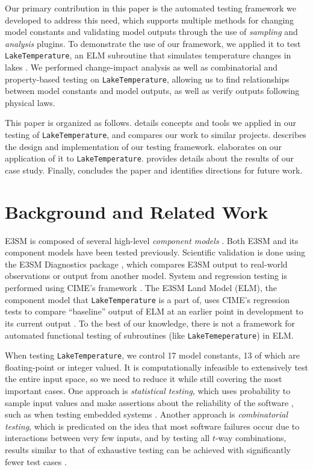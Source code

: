\documentclass[10pt,twocolumn]{article}
\newcommand{\term}[1]{%
    \emph{#1}%
}
\begin{document}
Our primary contribution in this paper is the automated testing framework we
developed to address this need, which supports multiple methods for changing model 
constants and validating model outputs through the use of {\it sampling} and {\it 
analysis} plugins. To demonstrate the use of our framework, we applied it to test
\verb|LakeTemperature|, an ELM subroutine that simulates temperature changes in lakes 
\cite{laketemperature}. We performed change-impact analysis as well as combinatorial and 
property-based testing on \verb|LakeTemperature|, allowing us to find relationships 
between model constants and model outputs, as well as verify outputs following physical laws.

This paper is organized as follows.  details concepts and tools we 
applied in our testing of \verb|LakeTemperature|, and compares our work to similar 
projects.  describes the design and implementation 
of our testing framework.  elaborates on our application of it to 
\verb|LakeTemperature|.  provides details about the results of our case 
study. Finally,  concludes the paper and identifies directions for 
future work.

\section{Background and Related Work}
\label{sec:background}

E3SM is composed of several high-level \term{component models}. Both E3SM and its component
models have been tested previously. Scientific validation is done using the E3SM 
Diagnostics package \cite{e3sm-diag}, which compares E3SM output to real-world 
observations or output from another model. System and regression testing is performed 
using CIME's framework \cite{cime}. The E3SM Land Model (ELM), the component model 
that \verb|LakeTemperature| is a part of, uses CIME's regression tests to compare 
``baseline'' output of ELM at an earlier point in development to its current output
\cite{elm-testing}. To the best of our knowledge, there is not a framework for 
automated functional testing of subroutines (like \verb|LakeTemeperature|) in 
ELM.

When testing \verb|LakeTemperature|, we control 17 model constants, 13 of which are
floating-point or integer valued. It is computationally infeasible to
extensively test the entire input space, so we need to reduce it while still covering the 
most important cases. One approach is {\it statistical testing}, which uses probability to 
sample input values and make assertions about the reliability of the software 
\cite{statistical-cleanroom}, such as when testing embedded systems
\cite{statistical-embedded}. 
Another approach is {\it combinatorial testing}, which is 
predicated on the idea that most software failures occur due to interactions between very 
few inputs, and by testing all $t$-way combinations, results similar to that 
of exhaustive testing can be achieved with significantly fewer test cases 
\cite{combinatorial-emperical}. %
\end{document}
